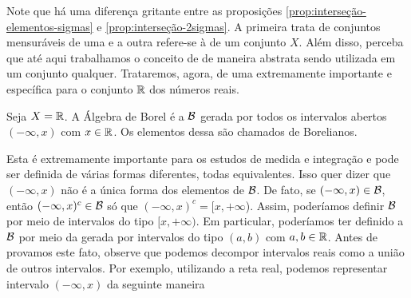 Note que há uma diferença gritante entre as proposições \ref{prop:interseção-elementos-sigmas} e \ref{prop:interseção-2sigmas}.
A primeira trata de conjuntos mensuráveis de uma \sigal e a outra refere-se à \sigals de um conjunto $X$.
Além disso, perceba que até aqui trabalhamos o conceito de \sigal de maneira abstrata sendo utilizada em um conjunto qualquer. 
Trataremos, agora, de uma \sigal extremamente importante e específica para o conjunto $\mathbb{R}$ dos números reais.

\begin{definition}
\label{def:algebra-borel}
    Seja $X = \mathbb{R}$. A Álgebra de Borel é a \sigal $\operatorname{\mathcal{B}}$ gerada por todos os intervalos abertos $(-\infty,x)$ com $ x  \in \mathbb{R}$. 
    Os elementos dessa \sigal são chamados de Borelianos.

\end{definition}

Esta \sigal é extremamente importante para os estudos de medida e integração e pode ser definida de várias formas diferentes, todas equivalentes.
Isso quer dizer que $(-\infty, x)$ não é a única forma dos elementos de $\operatorname{\mathcal{B}}$. 
De fato, se  $(-\infty, x) \in \operatorname{\mathcal{B}}$, então $(-\infty, x)^c \in \operatorname{\mathcal{B}}$ só que $(-\infty, x)^c = [x, +\infty$).
Assim, poderíamos  definir  $\operatorname{\mathcal{B}}$ por meio de intervalos do tipo $[x, +\infty)$.
Em particular, poderíamos ter definido a $\operatorname{\mathcal{B}}$ por meio da \sigal gerada por intervalos do tipo $(a,b)$ com $a,b \in \mathbb{R}$. Antes de provamos este fato, observe que podemos decompor intervalos reais como a união de outros intervalos. 
Por exemplo, utilizando a reta real, podemos representar intervalo $(-\infty, x)$ da seguinte maneira


